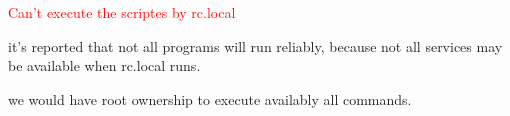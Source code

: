 \textcolor{red}{Can't execute the scriptes by rc.local}\par
it's reported that not all programs will run reliably, 
because not all services may be available when rc.local runs.
\par 
we would have root ownership to execute availably all commands.

